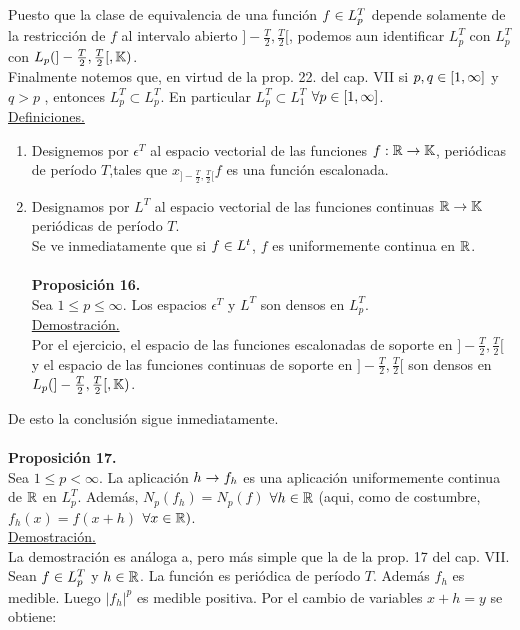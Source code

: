 Puesto que la clase de equivalencia de una función $f \in L_p^T$ depende solamente de la restricción de $f$ al intervalo abierto $]-\frac{T}{2},\frac{T}{2}[$, podemos aun identificar $L_p^T$ con $L_p^T$ con $L_p (]-\frac{T}{2},\frac{T}{2}[, \mathbb{K})$. \\
Finalmente notemos que, en virtud de la prop. 22. del cap. VII si $p,q \in [1,\infty]$ y $q>p$ , entonces $L_p^T \subset L_p^T$. En particular $L_p^T \subset L_1^T$ $\forall p \in [1,\infty]$. \\
\underline{Definiciones.}\\
\begin{enumerate}[1)]
\item Designemos por $\epsilon^T$ al espacio vectorial de las funciones $f:\mathbb{R} \rightarrow \mathbb{K}$, periódicas de período $T$,tales que $x_{]-\frac{T}{2},\frac{T}{2}[}f$ es una función escalonada.

\item Designamos por $L^T$ al espacio vectorial de las funciones continuas $\mathbb{R} \rightarrow \mathbb{K}$ periódicas de período $T$.\\
Se ve inmediatamente que si $f\in L^t$, $f$ es uniformemente continua en $\mathbb{R}$. \\ \\
\textbf{Proposición 16.} \\
Sea $1 \leq p \leq \infty$. Los espacios $\epsilon^T$ y $L^T$ son densos en $L_p^T$.\\
\underline{Demostración.} \\
Por el ejercicio, el espacio de las funciones escalonadas de soporte en $]-\frac{T}{2},\frac{T}{2}[$ y el espacio de las funciones continuas de soporte en $]-\frac{T}{2},\frac{T}{2}[$ son densos en $L_p (]-\frac{T}{2},\frac{T}{2}[,\mathbb{K})$. 

\end{enumerate}
De esto la conclusión sigue inmediatamente. \\ \\
\textbf{Proposición 17.} \\
Sea $1 \leq p < \infty$. La aplicación $h \rightarrow f_h$ es una aplicación uniformemente continua de $\mathbb{R}$ en $L_p^T$. Además, $N_p(f_h)=N_p(f)$ $\forall h \in\mathbb{R}$ (aqui, como de costumbre, $f_h (x)=f(x+h)$ $\forall x \in \mathbb{R})$. \\
\underline{Demostración.}\\
La demostración es  análoga a, pero más simple que la de la prop. 17 del cap. VII. \\
Sean $f \in L_p^T$ y $h \in \mathbb{R}$. La función es periódica de período $T$. Además $f_h$ es medible. Luego $|f_h|^p$ es medible positiva. Por el cambio de variables $x+h=y$ se obtiene:

